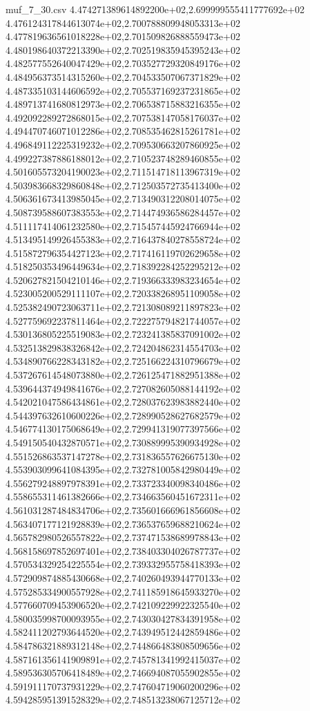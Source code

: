 \begin{filecontents*}{muf_7_30.csv}
4.474271389614892200e+02,2.699999555411777692e+02
4.476124317844613074e+02,2.700788809948053313e+02
4.477819636561018228e+02,2.701509826888559473e+02
4.480198640372213390e+02,2.702519835945395243e+02
4.482577552640047429e+02,2.703527729320849176e+02
4.484956373514315260e+02,2.704533507067371829e+02
4.487335103144606592e+02,2.705537169237231865e+02
4.489713741680812973e+02,2.706538715883216355e+02
4.492092289272868015e+02,2.707538147058176037e+02
4.494470746071012286e+02,2.708535462815261781e+02
4.496849112225319232e+02,2.709530663207860925e+02
4.499227387886188012e+02,2.710523748289460855e+02
4.501605573204190023e+02,2.711514718113967319e+02
4.503983668329860848e+02,2.712503572735413400e+02
4.506361673413985045e+02,2.713490312208014075e+02
4.508739588607383553e+02,2.714474936586284457e+02
4.511117414061232580e+02,2.715457445924766944e+02
4.513495149926455383e+02,2.716437840278558724e+02
4.515872796354427123e+02,2.717416119702629658e+02
4.518250353496449634e+02,2.718392284252295212e+02
4.520627821504210146e+02,2.719366333983234654e+02
4.523005200529111107e+02,2.720338268951109058e+02
4.525382490723063711e+02,2.721308089211897823e+02
4.527759692237811464e+02,2.722275794821744057e+02
4.530136805225519083e+02,2.723241385837091002e+02
4.532513829838326842e+02,2.724204862314554703e+02
4.534890766228343182e+02,2.725166224310796679e+02
4.537267614548073880e+02,2.726125471882951388e+02
4.539644374949841676e+02,2.727082605088144192e+02
4.542021047586434861e+02,2.728037623983882440e+02
4.544397632610600226e+02,2.728990528627682579e+02
4.546774130175068649e+02,2.729941319077397566e+02
4.549150540432870571e+02,2.730889995390934928e+02
4.551526863537147278e+02,2.731836557626675130e+02
4.553903099641084395e+02,2.732781005842980449e+02
4.556279248897978391e+02,2.733723340098340486e+02
4.558655311461382666e+02,2.734663560451672311e+02
4.561031287484834706e+02,2.735601666961856608e+02
4.563407177121928839e+02,2.736537659688210624e+02
4.565782980526557822e+02,2.737471538689978843e+02
4.568158697852697401e+02,2.738403304026787737e+02
4.570534329254225554e+02,2.739332955758418393e+02
4.572909874885430668e+02,2.740260493944770133e+02
4.575285334900557928e+02,2.741185918645933270e+02
4.577660709453906520e+02,2.742109229922325540e+02
4.580035998700093955e+02,2.743030427834391958e+02
4.582411202793644520e+02,2.743949512442859486e+02
4.584786321889312148e+02,2.744866483808509656e+02
4.587161356141909891e+02,2.745781341992415037e+02
4.589536305706418489e+02,2.746694087055902855e+02
4.591911170737931229e+02,2.747604719060200296e+02
4.594285951391528329e+02,2.748513238067125712e+02

\end{filecontents*}
